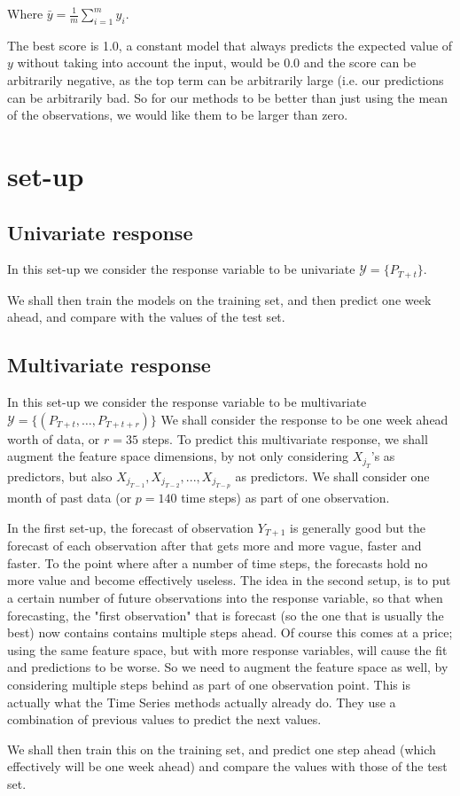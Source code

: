 Where $\bar{y} = \frac{1}{m} \sum_{i=1}^m y_i$. %

The best score is 1.0, a constant model that always predicts the expected value of $y$ without taking into account the input, would be 0.0 and the score can be arbitrarily negative, as the top term can be arbitrarily large (i.e. our predictions can be arbitrarily bad. So for our methods to be better than just using the mean of the observations, we would like them to be larger than zero.

\section{set-up}

\subsection{Univariate response}
In this set-up we consider the response variable to be univariate $\mathcal{Y}=\{P_{T+t}\}$.

We shall then train the models on the training set, and then predict one week ahead, and compare with the values of the test set.

\subsection{Multivariate response}
In this set-up we consider the response variable to be multivariate 
$\mathcal{Y}=\{ (P_{T+t},\dots,P_{T+t+r}) \}$
We shall consider the response to be one week ahead worth of data, or $r=35$ steps. To predict this multivariate response, we shall augment the feature space dimensions, by not only considering $X_{j_T}$'s as predictors, but also $X_{j_{T-1}},X_{j_{T-2}},...,X_{j_{T-p}}$ as predictors. We shall consider one month of past data (or $p=140$ time steps) as part of one observation.

In the first set-up, the forecast of observation $Y_{T+1}$ is generally good but the forecast of each observation after that gets more and more vague, faster and faster. To the point where after a number of time steps, the forecasts hold no more value and become effectively useless. The idea in the second setup, is to put a certain number of future observations into the response variable, so that when forecasting, the "first observation" that is forecast (so the one that is usually the best) now contains contains multiple steps ahead. Of course this comes at a price; using the same feature space, but with more response variables, will cause the fit and predictions to be worse. So we need to augment the feature space as well, by considering multiple steps behind as part of one observation point. This is actually what the Time Series methods actually already do. They use a combination of previous values to predict the next values.

We shall then train this on the training set, and predict one step ahead (which effectively will be one week ahead) and compare the values with those of the test set.
